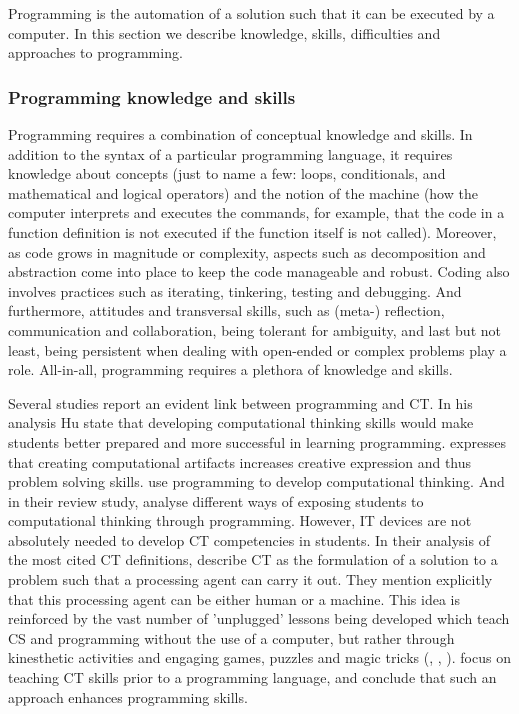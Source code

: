 Programming is the automation of a solution such that it can be executed by a computer. In this section we describe knowledge, skills, difficulties and approaches to programming.

\subsubsection{Programming knowledge and skills}\label{ProgrammingKnowledgeAndSkills}
Programming requires a combination of conceptual knowledge and skills. In addition to the syntax of a particular programming language, it requires knowledge about concepts (just to name a few: loops, conditionals, and mathematical and logical operators) and the notion of the machine (how the computer interprets and executes the commands, for example, that the code in a function definition is not executed if the function itself is not called). Moreover, as code grows in magnitude or complexity, aspects such as decomposition and abstraction come into place to keep the code manageable and robust. Coding also involves practices such as iterating, tinkering, testing and debugging. And furthermore, attitudes and transversal skills, such as (meta-) reflection, communication and collaboration, being tolerant for ambiguity, and last but not least, being persistent when dealing with open-ended or complex problems play a role. All-in-all, programming requires a plethora of knowledge and skills.


Several studies report an evident link between programming and CT. In his analysis Hu \cite{hu2011computational} state that developing computational thinking skills would make students better prepared and more successful in learning programming.  expresses that creating computational artifacts increases creative expression and thus problem solving skills.  use programming to develop computational thinking. And in their review study,  analyse different ways of exposing students to computational thinking through programming. However, IT devices are not absolutely needed to develop CT competencies in students\cite{corradini2017conceptions}. In their analysis of the most cited CT definitions, \cite{corradini2017conceptions} describe CT as the formulation of a solution to a problem such that a processing agent can carry it out. They mention explicitly that this processing agent can be either human or a machine. This idea is reinforced by the vast number of 'unplugged' lessons being developed which teach CS and programming without the use of a computer, but rather through kinesthetic activities and engaging games, puzzles and magic tricks (\cite{curzon2009CT}, \cite{CSUnplugged}, \cite{CSFieldGuide}).  focus on teaching CT skills prior to a programming language, and conclude that such an approach enhances programming skills.


